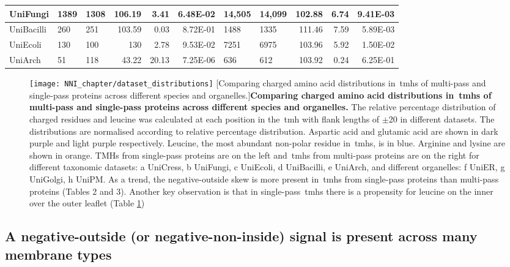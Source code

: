 \begin{table}[htbp]
{\begin{tabular}{ p{5em} l l r r r l l r r r }
    \midrule
    UniFungi & 1389  & 1308  & 106.19 & 3.41  & 6.48E-02 & 14,505 & 14,099 & 102.88 & 6.74  & 9.41E-03 \\
    \midrule
    UniBacilli & 260   & 251   & 103.59 & 0.03  & 8.72E-01 & 1488  & 1335  & 111.46 & 7.59  & 5.89E-03 \\
    \midrule
    UniEcoli & 130   & 100   & 130   & 2.78  & 9.53E-02 & 7251  & 6975  & 103.96 & 5.92  & 1.50E-02 \\
    \midrule
    UniArch & 51    & 118   & 43.22 & 20.13 & 7.25E-06 & 636   & 612   & 103.92 & 0.24  & 6.25E-01 \\
    \bottomrule
    \end{tabular}
    }%
   \label{table:leucineskewstats}

\end{table}%

\begin{figure}[!ht]
\centering
\texttt{[image: NNI\_chapter/dataset\_distributions]}
[Comparing charged amino acid distributions in~\gls{tmh}s of multi-pass and single-pass proteins across different species and organelles.]{\textbf{Comparing charged amino acid distributions in~\gls{tmh}s of multi-pass and single-pass proteins across different species and organelles.} The relative percentage distribution of charged residues and leucine was calculated at each position in the~\gls{tmh} with flank lengths of $\pm$20 in different datasets.
The distributions are normalised according to relative percentage distribution.
Aspartic acid and glutamic acid are shown in dark purple and light purple respectively.
Leucine, the most abundant non-polar residue in~\gls{tmh}s, is in blue.
Arginine and lysine are shown in orange.
TMHs from single-pass proteins are on the left and~\gls{tmh}s from multi-pass proteins are on the right for different taxonomic datasets: a UniCress, b UniFungi, c UniEcoli, d UniBacilli, e UniArch, and different organelles: f UniER, g UniGolgi, h UniPM.
As a trend, the negative-outside skew is more present in~\gls{tmh}s from single-pass proteins than multi-pass proteins (Tables 2 and 3).
Another key observation is that in single-pass~\gls{tmh}s there is a propensity for leucine on the inner over the outer leaflet (Table \ref{table:leucineskewstats})}


\label{fig:dataset_distributions}
\end{figure}

\subsection{A negative-outside (or negative-non-inside) signal is present across many membrane types}

